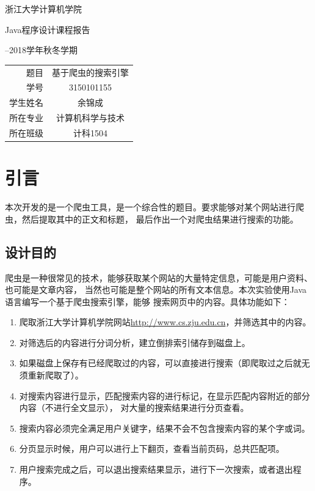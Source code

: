\documentclass[UTF8,a4paper,12pt]{ctexart}
\begin{document}
\pagestyle{fancy}
\fancyhead{}
\fancyhead[L]{\kaishu \rightmark}
\fancyfoot{}
\fancyfoot[R]{\thepage}
\begin{titlepage}
\thispagestyle{empty}
\vspace*{\fill}
\begin{center}
{\fontsize{21.1pt}{42.2pt}\heiti 浙江大学计算机学院 \par}
{\fontsize{16.1pt}{32.2pt} \selectfont Java程序设计课程报告 \par}
{\fontsize{14.1pt}{28.2pt} --2018学年秋冬学期 \par}
\end{center}
\vspace{30pt}
\begin{table}[htbp!]
\centering
\fontsize{15}{20} \selectfont \heiti
\begin{tabular}{rc}
题目 & 基于爬虫的搜索引擎 \\
\cline{2-2}
学号 & 3150101155 \\
\cline{2-2}
学生姓名 & 余锦成 \\
\cline{2-2}
所在专业 & 计算机科学与技术 \\
\cline{2-2}
所在班级 & 计科1504 \\
\cline{2-2}
\end{tabular}
\end{table}
\vspace*{\fill}
\pagebreak
\thispagestyle{empty}
\tableofcontents
\pagebreak
\end{titlepage}
\section{引言}
本次开发的是一个爬虫工具，是一个综合性的题目。要求能够对某个网站进行爬虫，然后提取其中的正文和标题，
最后作出一个对爬虫结果进行搜索的功能。\par
\subsection{设计目的}
爬虫是一种很常见的技术，能够获取某个网站的大量特定信息，可能是用户资料、也可能是文章内容，
当然也可能是整个网站的所有文本信息。本次实验使用Java语言编写一个基于爬虫搜索引擎，能够
搜索网页中的内容。具体功能如下：
\begin{enumerate}[label=(\arabic*),wide=2em]
\item 爬取浙江大学计算机学院网站\url{http://www.cs.zju.edu.cn}，并筛选其中的内容。
\item 对筛选后的内容进行分词分析，建立倒排索引储存到磁盘上。
\item 如果磁盘上保存有已经爬取过的内容，可以直接进行搜索（即爬取过之后就无须重新爬取了）。
\item 对搜索内容进行显示，匹配搜索内容的进行标记，在显示匹配内容附近的部分内容（不进行全文显示），
对大量的搜索结果进行分页查看。
\item 搜索内容必须完全满足用户关键字，结果不会不包含搜索内容的某个字或词。
\item 分页显示时候，用户可以进行上下翻页，查看当前页码，总共匹配项。
\item 用户搜索完成之后，可以退出搜索结果显示，进行下一次搜索，或者退出程序。
\end{enumerate}
\end{document}
